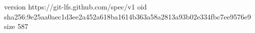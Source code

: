 version https://git-lfs.github.com/spec/v1
oid sha256:9e25aa0aec1d3ee2a452a618ba1614b363a58a2813a93b02e334fbc7ee9576e9
size 587
